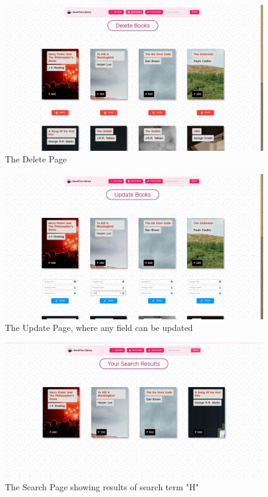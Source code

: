 \documentclass[11pt]{article}
\begin{document}
\begin{figure}[H]
    \centering
    \includegraphics[width=.95\textwidth]{Screenshots/delete.png}
    \caption{The Delete Page}
\end{figure}
\begin{figure}[H]

    \centering
    \includegraphics[width=.95\textwidth]{Screenshots/update.png}
    \caption{The Update Page, where any field can be updated}
\end{figure}

\begin{figure}[H]
    \centering
    \includegraphics[width=.95\textwidth]{Screenshots/search.png}
    \caption{The Search Page showing results of search term "H"}
\end{figure}
\end{document}
